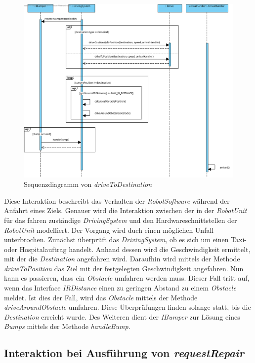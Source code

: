 \begin{figure}[H]
	\centering
	\includegraphics[width=1\textwidth]{img/8-driveToDestination}
	\caption{Sequenzdiagramm von \emph{driveToDestination}}
	\label{driveToDestinationInteraktion}
\end{figure}
Diese Interaktion beschreibt das Verhalten der \textit{RobotSoftware} während der Anfahrt eines Ziels. Genauer wird die Interaktion zwischen der in der \textit{RobotUnit} für das fahren zuständige \textit{DrivingSystem} und den Hardwareschnittstellen der \textit{RobotUnit} modelliert. Der Vorgang wird duch einen möglichen Unfall unterbrochen. Zunächst überprüft das \textit{DrivingSystem}, ob es sich um einen Taxi- oder Hospitalauftrag handelt. Anhand dessen wird die Geschwindigkeit ermittelt, mit der die \textit{Destination} angefahren wird. Daraufhin wird mittels der Methode \textit{driveToPosition} das Ziel mit der festgelegten Geschwindigkeit angefahren. Nun kann es passieren, dass ein \textit{Obstacle} umfahren werden muss. Dieser Fall tritt auf, wenn das Interface \textit{IRDistance} einen zu geringen Abstand zu einem \textit{Obstacle} meldet. Ist dies der Fall, wird das \textit{Obstacle} mittels der Methode \textit{driveAroundObstacle} umfahren. Diese Überprüfungen finden solange statt, bis die \textit{Destination} erreicht wurde. Des Weiteren dient der \textit{IBumper} zur Lösung eines \textit{Bumps} mittels der Methode \textit{handleBump}.
\\

	
\subsection*{Interaktion bei Ausführung von \textit{requestRepair}}

